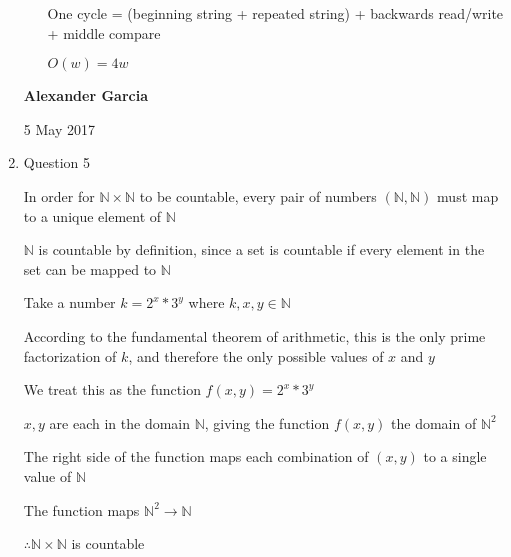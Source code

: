 \documentclass[11pt]{article}
\begin{document}
\begin{enumerate}
\begin{enumerate}[(a)]
				One cycle = (beginning string + repeated string) + backwards read/write + middle compare

				$O(w) = 4w$

		\end{enumerate}
			\newpage

			\textbf{Alexander Garcia}

			5 May 2017 \\

		\item Question 5

			In order for $\mathbb{N} \times \mathbb{N}$ to be countable, every pair of numbers $(\mathbb{N}, \mathbb{N})$ must
			map to a unique element of $\mathbb{N}$

			$\mathbb{N}$ is countable by definition, since a set is countable if every element in the set can be mapped to
			$\mathbb{N}$

			Take a number $k = 2^x*3^y$ where $k,x,y \in \mathbb{N}$

			According to the fundamental theorem of arithmetic, this is the only prime factorization of $k$, and therefore
			the only possible values of $x$ and $y$

			We treat this as the function $f(x,y) = 2^x*3^y$

			$x,y$ are each in the domain $\mathbb{N}$, giving the function $f(x,y)$ the domain of $\mathbb{N}^2$

			The right side of the function maps each combination of $(x,y)$ to a single value of $\mathbb{N}$

			The function maps $\mathbb{N}^2 \rightarrow \mathbb{N}$

			\begin{center}
			$\therefore \mathbb{N} \times \mathbb{N}$ is countable
			\end{center}

	\end{enumerate}
\end{document}
